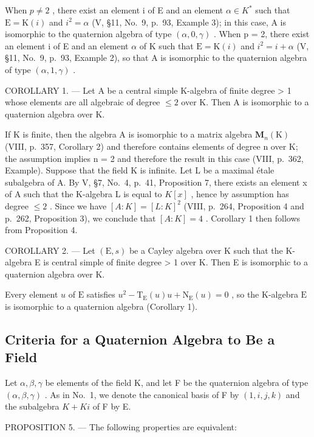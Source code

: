 When \(p \neq 2\) , there exist an element i of E and an element \(\alpha \in K^{*}\) such that \(\mathrm{E} = \mathrm{K}(i)\) and \(i^{2} = \alpha\) (V, §11, No.~9, p.~93, Example 3); in this case, A is isomorphic to the quaternion algebra of type \((\alpha, 0, \gamma)\) . When p = 2, there exist an element i of E and an element \(\alpha\) of K such that \(\mathrm{E} = \mathrm{K}(i)\) and \(i^{2} = i + \alpha\) (V, §11, No.~9, p.~93, Example 2), so that A is isomorphic to the quaternion algebra of type \((\alpha, 1, \gamma)\) .

COROLLARY 1. --- Let A be a central simple K-algebra of finite degree \textgreater{} 1 whose elements are all algebraic of degree \(\leqslant 2\) over K. Then A is isomorphic to a quaternion algebra over K.

If K is finite, then the algebra A is isomorphic to a matrix algebra \(\mathbf{M}_{n}(\mathrm{K})\) (VIII, p.~357, Corollary 2) and therefore contains elements of degree n over K; the assumption implies n = 2 and therefore the result in this case (VIII, p.~362, Example). Suppose that the field K is infinite. Let L be a maximal étale subalgebra of A. By V, §7, No.~4, p.~41, Proposition 7, there exists an element x of A such that the K-algebra L is equal to \(K[x]\) , hence by assumption has degree \(\leqslant 2\) . Since we have \([A : K] = [L : K]^{2}\) (VIII, p.~264, Proposition 4 and p.~262, Proposition 3), we conclude that \([A : K] = 4\) . Corollary 1 then follows from Proposition 4.

COROLLARY 2. --- Let \((\mathrm{E}, s)\) be a Cayley algebra over K such that the K-algebra E is central simple of finite degree \textgreater{} 1 over K. Then E is isomorphic to a quaternion algebra over K.

Every element \(u\) of \(\mathrm{E}\) satisfies \(u^2 - \mathrm{T}_{\mathrm{E}}(u)u + \mathrm{N}_{\mathrm{E}}(u) = 0\) , so the K-algebra \(\mathrm{E}\) is isomorphic to a quaternion algebra (Corollary 1).

\subsection{Criteria for a Quaternion Algebra to Be a Field}

Let \(\alpha,\beta,\gamma\) be elements of the field K, and let F be the quaternion algebra of type \((\alpha,\beta,\gamma)\) . As in No.~1, we denote the canonical basis of F by \((1,i,j,k)\) and the subalgebra \(K+Ki\) of F by E.

PROPOSITION 5. --- The following properties are equivalent:

